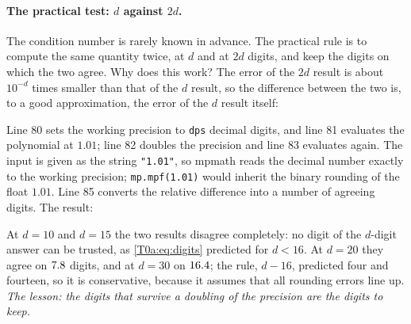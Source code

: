 \paragraph{The practical test: $d$ against $2d$.} The condition number is rarely known in advance. The practical rule is to compute the same quantity twice, at $d$ and at $2d$ digits, and keep the digits on which the two agree. Why does this work? The error of the $2d$ result is about $10^{-d}$ times smaller than that of the $d$ result, so the difference between the two is, to a good approximation, the error of the $d$ result itself:


Line 80 sets the working precision to \texttt{dps} decimal digits, and line 81 evaluates the polynomial at $1.01$; line 82 doubles the precision and line 83 evaluates again. The input is given as the string \texttt{"1.01"}, so mpmath reads the decimal number exactly to the working precision; \texttt{mp.mpf(1.01)} would inherit the binary rounding of the float $1.01$. Line 85 converts the relative difference into a number of agreeing digits. The result:


At $d=10$ and $d=15$ the two results disagree completely: no digit of the $d$-digit answer can be trusted, as \eqref{T0a:eq:digits} predicted for $d<16$. At $d=20$ they agree on $7.8$ digits, and at $d=30$ on $16.4$; the rule, $d-16$, predicted four and fourteen, so it is conservative, because it assumes that all rounding errors line up. \emph{The lesson: the digits that survive a doubling of the precision are the digits to keep.}

